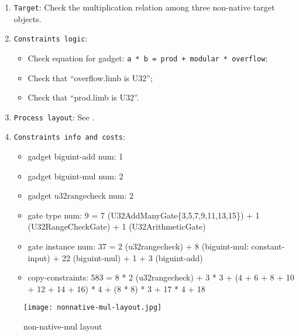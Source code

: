 
\begin{enumerate}
    \item \verb|Target|: Check the multiplication relation among three non-native target objects.
    \item \verb|Constraints logic|:
    \begin{itemize}
        \item Check equation for gadget: \verb|a * b = prod + modular * overflow|;
        \item Check that ``overflow.limb is U32'';
        \item Check that ``prod.limb is U32''.
    \end{itemize}
    \item \verb|Process layout|: See .
    \item \verb|Constraints info and costs|:
    \begin{itemize}
        \item gadget biguint-add num: 1
        \item gadget biguint-mul num: 2
        \item gadget u32rangecheck num: 2
        \item gate type num: 9 = 7 (U32AddManyGate\{3,5,7,9,11,13,15\}) + 1 (U32RangeCheckGate) + 1 (U32ArithmeticGate)
        \item gate instance num: 37 = 2 (u32rangecheck) + 8 (biguint-mul: constant-input) + 22 (biguint-mul) + 1 + 3 (biguint-add)
        \item copy-constraints: 583 = 8 * 2 (u32rangecheck) + 3 * 3 + (4 + 6 + 8 + 10 + 12 + 14 + 16) * 4 + (8 * 8) * 3 + 17 * 4 + 18
    \end{itemize}
\end{enumerate}

\begin{figure}[!ht]
    \centering
    \texttt{[image: nonnative-mul-layout.jpg]}
    \caption{non-native-mul layout}
    \label{fig:non-native-mul-layout}
\end{figure}
